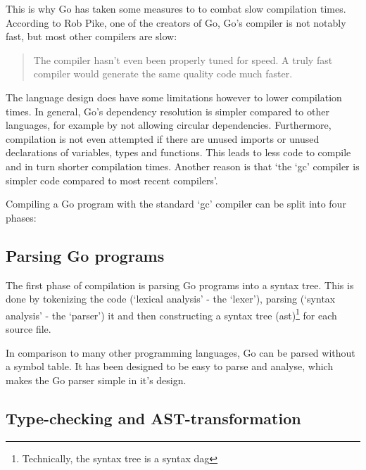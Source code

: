 This is why Go has taken some measures to to combat slow compilation times. According
to Rob Pike, one of the creators of Go, Go's compiler is not notably fast, but
most other compilers are slow:

\begin{quote}
    The compiler hasn't even been properly tuned for speed. A truly fast compiler
    would generate the same quality code much faster.\autocite{nuts-compiler}
\end{quote}

The language design does have some limitations
however to lower compilation times. In general, Go's dependency resolution is simpler
compared to other languages, for example by not allowing circular dependencies.
Furthermore, compilation is not even attempted if there are unused
imports or unused declarations of variables, types and functions.
This leads to less code to compile and in turn shorter compilation times.
Another reason is that `the `gc' compiler is simpler code compared to most
recent compilers'\autocite{nuts-compiler}.

Compiling a Go program with the standard `gc' compiler can be split into four
phases:

\subsection{Parsing Go programs}


The first phase of compilation is parsing Go programs into a syntax tree. This
is done by tokenizing the code (`lexical analysis' - the `lexer'), parsing
(`syntax analysis' - the `parser') it and then constructing a syntax tree
(\gls{ast})\footnote{Technically, the syntax tree is a syntax \gls{dag}\autocite{ast-node-dag}}
for each source file.

In comparison to many other programming languages, Go can be parsed without a
symbol table. It has been designed to be easy to parse
and analyse, which makes the Go parser simple in it's design\autocite{go-faq-symbol}.

\subsection{Type-checking and AST-transformation}\label{sec:comp-type}

